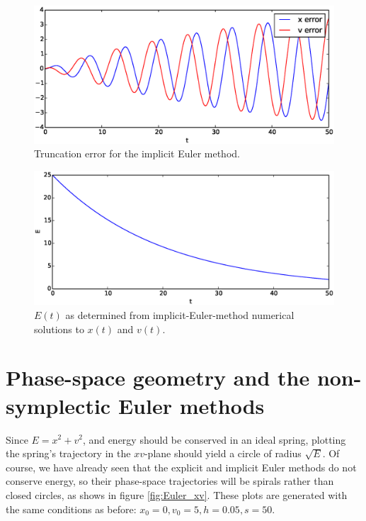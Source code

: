 \documentclass{article}
\theoremstyle{definition}
\renewcommand{\>}{\rangle}
\newcommand{\<}{\langle}
\begin{document}
\begin{figure}
\includegraphics[width=\textwidth]{implicit_error.eps}
\caption{\label{fig:implicit_error}Truncation error for
the implicit Euler method.}
\end{figure}

\begin{figure}
\includegraphics[width=\textwidth]{implicit_E.eps}
\caption{\label{fig:implicit_E}$E(t)$ as determined from implicit-Euler-method numerical
solutions to $x(t)$ and $v(t)$.}
\end{figure}

\section{Phase-space geometry and the non-symplectic Euler methods}

Since $E=x^2 + v^2$, and energy should be conserved in an ideal spring,
plotting the spring's trajectory in the $xv$-plane should yield a circle of radius
$\sqrt{E}$. Of course, we have already seen that the explicit and implicit Euler
methods do not conserve energy, so their phase-space trajectories will be spirals
rather than closed circles, as shows in figure \ref{fig:Euler_xv}.
These plots are generated with the same conditions as before:
$x_0 = 0, v_0 = 5, h = 0.05, s = 50$.
\end{document}
